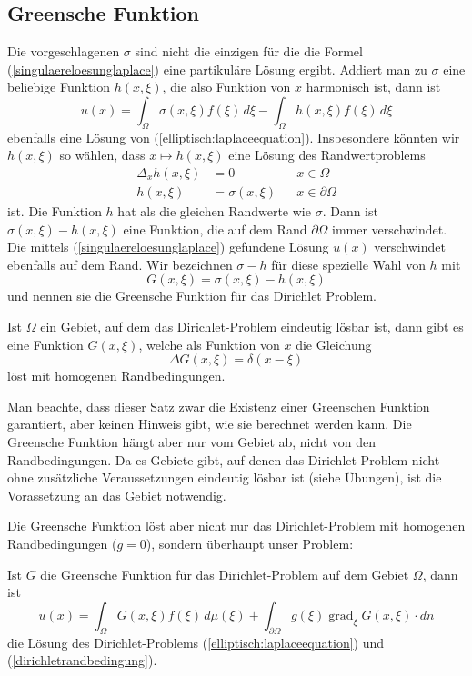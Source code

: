 \subsection{Greensche Funktion}
Die vorgeschlagenen $\sigma$ sind nicht die einzigen für die die
Formel (\ref{singulaereloesunglaplace}) eine partikuläre Lösung ergibt.
Addiert man zu $\sigma$ eine beliebige Funktion $h(x,\xi)$, die
also Funktion von $x$ harmonisch ist, dann ist
\[
u(x)=\int_{\Omega}\sigma(x,\xi)f(\xi)\,d\xi-\int_{\Omega}h(x,\xi)f(\xi)\,d\xi
\]
ebenfalls eine Lösung von (\ref{elliptisch:laplaceequation}). Insbesondere
könnten wir $h(x,\xi)$ so wählen, dass
$x\mapsto h(x,\xi)$ eine Lösung des Randwertproblems
\begin{align*}
\Delta_x h(x,\xi)&=0&&x\in\Omega\\
h(x,\xi)&=\sigma(x,\xi)&&x\in\partial\Omega
\end{align*}
ist.
Die Funktion $h$ hat als die gleichen Randwerte wie $\sigma$.
Dann ist $\sigma(x,\xi)-h(x,\xi)$ eine Funktion, die auf dem
Rand $\partial\Omega$ immer verschwindet.
Die mittels
(\ref{singulaereloesunglaplace}) gefundene Lösung $u(x)$
verschwindet ebenfalls auf dem Rand.
Wir bezeichnen $\sigma-h$ für diese spezielle Wahl von $h$ mit
\[
G(x,\xi)=\sigma(x,\xi)-h(x,\xi)
\]
und nennen sie die Greensche Funktion für das Dirichlet Problem.

\begin{satz}Ist $\Omega$ ein Gebiet, auf dem das Dirichlet-Problem
eindeutig lösbar ist, dann gibt es eine 
Funktion $G(x,\xi)$,
welche als Funktion von $x$ die Gleichung
\[
\Delta G(x,\xi)=\delta(x-\xi)
\]
löst mit homogenen Randbedingungen.
\end{satz}

Man beachte, dass dieser Satz zwar die Existenz einer Greenschen Funktion
garantiert, aber keinen Hinweis gibt, wie sie berechnet werden kann.
Die Greensche Funktion hängt aber nur vom Gebiet ab, nicht von den
Randbedingungen.
Da es Gebiete gibt, auf denen das Dirichlet-Problem nicht ohne zusätzliche
Veraussetzungen eindeutig lösbar ist (siehe Übungen), ist die
Vorassetzung an das Gebiet notwendig.

Die Greensche Funktion löst aber nicht nur das Dirichlet-Problem
mit homogenen Randbedingungen ($g=0$), sondern überhaupt
unser Problem:

\begin{satz}
\label{dirichletloesung}
Ist $G$ die Greensche Funktion für das Dirichlet-Problem auf dem
Gebiet $\Omega$, dann ist
\[
u(x)=\int_{\Omega}G(x,\xi)f(\xi)\,d\mu(\xi)+\int_{\partial\Omega}g(\xi)\operatorname{grad}_\xi G(x,\xi)\cdot dn
\]
die Lösung des Dirichlet-Problems (\ref{elliptisch:laplaceequation}) und
(\ref{dirichletrandbedingung}).
\end{satz}


